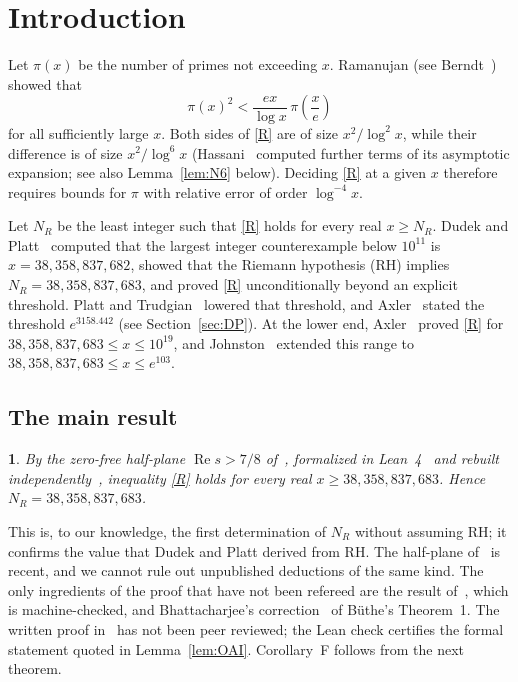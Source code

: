 \documentclass{amsart}
\theoremstyle{definition}
\theoremstyle{remark}
\theoremstyle{plain}
\newcommand{\lettername}{}
\newtheorem*{letteredthm*}{\lettername}
\newenvironment{lcor}[1]{\renewcommand{\lettername}{Corollary #1}\begin{letteredthm*}}{\end{letteredthm*}}
\numberwithin{equation}{section}
\newcommand{\NN}{38{,}358{,}837{,}683}
\newcommand{\NNm}{38{,}358{,}837{,}682}
\begin{document}
\maketitle

\section{Introduction}\label{sec:intro}

Let $\pi(x)$ be the number of primes not exceeding $x$. Ramanujan (see Berndt~\cite{Ber94}) showed that
\begin{equation*}\label{R}
\pi(x)^2<\frac{ex}{\log x}\,\pi\!\left(\frac{x}{e}\right)
\tag{R}
\end{equation*}
for all sufficiently large $x$. Both sides of \eqref{R} are of size $x^2/\log^2x$, while their difference is of size $x^2/\log^6x$ (Hassani~\cite{Has21} computed further terms of its asymptotic expansion; see also Lemma~\ref{lem:N6} below). Deciding \eqref{R} at a given $x$ therefore requires bounds for $\pi$ with relative error of order $\log^{-4}x$.

Let $N_R$ be the least integer such that \eqref{R} holds for every real $x\ge N_R$. Dudek and Platt~\cite{DP15} computed that the largest integer counterexample below $10^{11}$ is $x=\NNm$, showed that the Riemann hypothesis (RH) implies $N_R=\NN$, and proved \eqref{R} unconditionally beyond an explicit threshold. Platt and Trudgian~\cite{PT21b} lowered that threshold, and Axler~\cite[Thm.~1.1]{Ax22} stated the threshold $e^{3158.442}$ (see Section~\ref{sec:DP}). At the lower end, Axler~\cite[Thm.~1.3]{Ax17} proved \eqref{R} for $\NN\le x\le10^{19}$, and Johnston~\cite[Thm.~5.1]{Joh22} extended this range to $\NN\le x\le e^{103}$.

\subsection{The main result}

\begin{lcor}{F}
By the zero-free half-plane $\operatorname{Re}s>7/8$ of~\cite{OAI26}, formalized in Lean~4~\cite{OAI26} and rebuilt independently~\cite{Tom26}, inequality \eqref{R} holds for every real $x\ge\NN$. Hence $N_R=\NN$.
\end{lcor}

This is, to our knowledge, the first determination of $N_R$ without assuming RH; it confirms the value that Dudek and Platt derived from RH. The half-plane of~\cite{OAI26} is recent, and we cannot rule out unpublished deductions of the same kind. The only ingredients of the proof that have not been refereed are the result of~\cite{OAI26}, which is machine-checked, and Bhattacharjee's correction~\cite{Bha24} of B\"uthe's Theorem~1. The written proof in~\cite{OAI26} has not been peer reviewed; the Lean check certifies the formal statement quoted in Lemma~\ref{lem:OAI}. Corollary~F follows from the next theorem.
\end{document}
